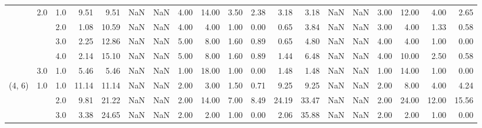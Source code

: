 \begin{tabular}{lllrrrrrrrrrrrrrrrr}
       & 2.0 & 1.0  &      9.51 &       9.51 &               NaN &                NaN &  4.00 &  14.00 &             3.50 &                         2.38 &      3.18 &       3.18 &               NaN &                NaN & 3.00 &  12.00 &             4.00 &                         2.65 \\
       &     & 2.0  &      1.08 &      10.59 &               NaN &                NaN &  4.00 &   4.00 &             1.00 &                         0.00 &      0.65 &       3.84 &               NaN &                NaN & 3.00 &   4.00 &             1.33 &                         0.58 \\
       &     & 3.0  &      2.25 &      12.86 &               NaN &                NaN &  5.00 &   8.00 &             1.60 &                         0.89 &      0.65 &       4.80 &               NaN &                NaN & 4.00 &   4.00 &             1.00 &                         0.00 \\
       &     & 4.0  &      2.14 &      15.10 &               NaN &                NaN &  5.00 &   8.00 &             1.60 &                         0.89 &      1.44 &       6.48 &               NaN &                NaN & 4.00 &  10.00 &             2.50 &                         0.58 \\
       & 3.0 & 1.0  &      5.46 &       5.46 &               NaN &                NaN &  1.00 &  18.00 &             1.00 &                         0.00 &      1.48 &       1.48 &               NaN &                NaN & 1.00 &  14.00 &             1.00 &                         0.00 \\
(4, 6) & 1.0 & 1.0  &     11.14 &      11.14 &               NaN &                NaN &  2.00 &   3.00 &             1.50 &                         0.71 &      9.25 &       9.25 &               NaN &                NaN & 2.00 &   8.00 &             4.00 &                         4.24 \\
       &     & 2.0  &      9.81 &      21.22 &               NaN &                NaN &  2.00 &  14.00 &             7.00 &                         8.49 &     24.19 &      33.47 &               NaN &                NaN & 2.00 &  24.00 &            12.00 &                        15.56 \\
       &     & 3.0  &      3.38 &      24.65 &               NaN &                NaN &  2.00 &   2.00 &             1.00 &                         0.00 &      2.06 &      35.88 &               NaN &                NaN & 2.00 &   2.00 &             1.00 &                         0.00 \\

\end{tabular}
